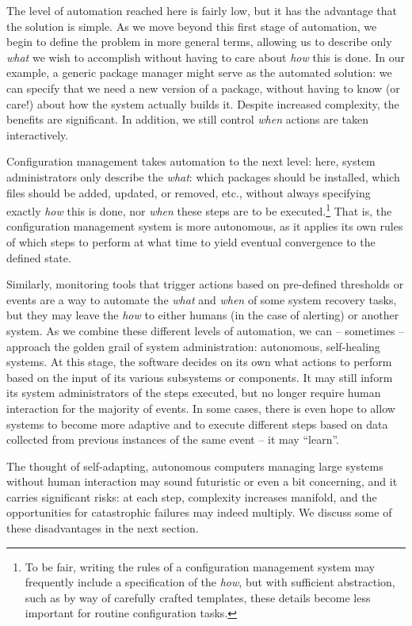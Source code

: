 The level of automation reached here is fairly low,
but it has the advantage that the solution is simple.
As we move beyond this first stage of automation, we
begin to define the problem in more general terms,
allowing us to describe only {\em what} we wish to
accomplish without having to care about {\em how} this
is done.  In our example, a generic package manager
might serve as the automated solution: we can specify
that we need a new version of a package, without
having to know (or care!) about how the system
actually builds it.  Despite increased complexity, the
benefits are significant.  In addition, we still
control {\em when} actions are taken interactively.

Configuration management takes automation to the next
level: here, system administrators only describe the
{\em what}: which packages should be installed, which
files should be added, updated, or removed, etc.,
without always specifying exactly {\em how} this is
done, nor {\em when} these steps are to be
executed.\footnote{To be fair, writing the rules of a
configuration management system may frequently include
a specification of the {\em how}, but with sufficient
abstraction, such as by way of carefully crafted
templates, these details become less important for
routine configuration tasks.} That is, the
configuration management system is more autonomous, as
it applies its own rules of which steps to perform at
what time to yield eventual convergence to the defined
state.

Similarly, monitoring tools that trigger actions based
on pre-defined thresholds or events are a way to
automate the {\em what} and {\em when} of some system
recovery tasks, but they may leave the {\em how} to
either humans (in the case of alerting) or another
system.  As we combine these different levels of
automation, we can -- sometimes -- approach the golden
grail of system administration: autonomous,
self-healing systems.  At this stage, the software
decides on its own what actions to perform based on
the input of its various subsystems or components.  It
may still inform its system administrators of the
steps executed, but no longer require human
interaction for the majority of events.  In some
cases, there is even hope to allow systems to become
more adaptive and to execute different steps based on
data collected from previous instances of the same
event -- it may ``learn''.

The thought of self-adapting, autonomous computers
managing large systems without human interaction may
sound futuristic or even a bit concerning, and it
carries significant risks: at each step, complexity
increases manifold, and the opportunities for
catastrophic failures may indeed multiply.  We discuss
some of these disadvantages in the next section.

